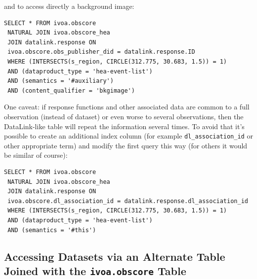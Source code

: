\noindent and to  access directly a background image:

{\small
\begin{verbatim}
SELECT * FROM ivoa.obscore
 NATURAL JOIN ivoa.obscore_hea
 JOIN datalink.response ON
 ivoa.obscore.obs_publisher_did = datalink.response.ID
 WHERE (INTERSECTS(s_region, CIRCLE(312.775, 30.683, 1.5)) = 1)
 AND (dataproduct_type = 'hea-event-list')
 AND (semantics = '#auxiliary')
 AND (content_qualifier = 'bkgimage')
\end{verbatim}
}

One caveat: if response functions and other associated data are common to a full observation (instead of dataset) or even worse to several observations, then the DataLink-like table will repeat the information several times. To avoid that it's possible to create an additional index column (for example  {\tt dl\_association\_id} or other appropriate term) and modify the first query this way (for others it would be similar of course):

{\small
\begin{verbatim}
SELECT * FROM ivoa.obscore
 NATURAL JOIN ivoa.obscore_hea
 JOIN datalink.response ON
 ivoa.obscore.dl_association_id = datalink.response.dl_association_id
 WHERE (INTERSECTS(s_region, CIRCLE(312.775, 30.683, 1.5)) = 1)
 AND (dataproduct_type = 'hea-event-list')
 AND (semantics = '#this')
\end{verbatim}
}

\subsection{Accessing Datasets via an Alternate Table Joined with the {\tt ivoa.obscore} Table}\label{sec:respaccess}



